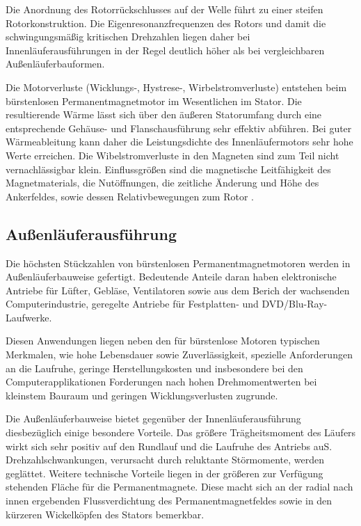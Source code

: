 Die Anordnung des Rotorrückschlusses auf der Welle führt zu einer steifen Rotorkonstruktion. Die Eigenresonanzfrequenzen des Rotors und damit die schwingungsmäßig kritischen Drehzahlen liegen daher bei Innenläuferausführungen in der Regel deutlich höher als bei vergleichbaren Außenläuferbauformen.

Die Motorverluste (Wicklungs-, Hystrese-, Wirbelstromverluste) entstehen beim bürstenlosen Permanentmagnetmotor im Wesentlichen im Stator. Die resultierende Wärme lässt sich über den äußeren Statorumfang durch eine entsprechende Gehäuse- und Flanschausführung sehr effektiv abführen. Bei guter Wärmeableitung kann daher die Leistungsdichte des Innenläufermotors sehr hohe Werte erreichen. Die Wibelstromverluste in den Magneten sind zum Teil nicht vernachlässigbar klein. Einflussgrößen sind die magnetische Leitfähigkeit des Magnetmaterials, die Nutöffnungen, die zeitliche Änderung und Höhe des Ankerfeldes, sowie dessen Relativbewegungen zum Rotor \parencite[S. 75--76]{Stölting2011}.

\subsection{Außenläuferausführung}

Die höchsten Stückzahlen von bürstenlosen Permanentmagnetmotoren werden in Außenläuferbauweise gefertigt. Bedeutende Anteile daran haben elektronische Antriebe für Lüfter, Gebläse, Ventilatoren sowie aus dem Berich der wachsenden Computerindustrie, geregelte Antriebe für Festplatten- und DVD/Blu-Ray-Laufwerke.

Diesen Anwendungen liegen neben den für bürstenlose Motoren typischen Merkmalen, wie hohe Lebensdauer sowie Zuverlässigkeit, spezielle Anforderungen an die Laufruhe, geringe Herstellungskosten und insbesondere bei den Computerapplikationen Forderungen nach hohen Drehmomentwerten bei kleinstem Bauraum und geringen Wicklungsverlusten zugrunde.

Die Außenläuferbauweise bietet gegenüber der Innenläuferausführung diesbezüglich einige besondere Vorteile. Das größere Trägheitsmoment des Läufers wirkt sich sehr positiv auf den Rundlauf und die Laufruhe des Antriebs auS.  Drehzahlschwankungen, verursacht durch reluktante Störmomente, werden geglättet. Weitere technische Vorteile liegen in der größeren zur Verfügung stehenden Fläche für die Permanentmagnete. Diese macht sich an der radial nach innen ergebenden Flussverdichtung des Permanentmagnetfeldes sowie in den kürzeren Wickelköpfen des Stators bemerkbar.

